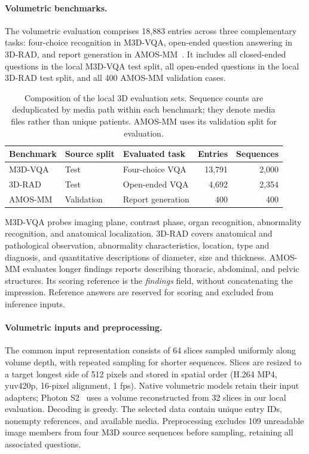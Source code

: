 \paragraph{Volumetric benchmarks.}
\label{app:datasets_3d}

The volumetric evaluation comprises 18,883 entries across three complementary tasks: four-choice recognition in M3D-VQA, open-ended question answering in 3D-RAD, and report generation in AMOS-MM~\citep{bai2024m3d,gai2025threedrad,ji2024amosmm}. It includes all closed-ended questions in the local M3D-VQA test split, all open-ended questions in the local 3D-RAD test split, and all 400 AMOS-MM validation cases.

\begin{table}[H]
\centering\small
\caption{Composition of the local 3D evaluation sets. Sequence counts are deduplicated by media path within each benchmark; they denote media files rather than unique patients. AMOS-MM uses its validation split for evaluation.}
\label{tab:datasets_3d}
\setlength{\tabcolsep}{4pt}
\renewcommand{\arraystretch}{1.10}
\begin{tabularx}{\linewidth}{@{}llYrr@{}}
\toprule
Benchmark & Source split & Evaluated task & Entries & Sequences\\
\midrule
M3D-VQA & Test & Four-choice VQA & 13,791 & 2,000\\
3D-RAD & Test & Open-ended VQA & 4,692 & 2,354\\
AMOS-MM & Validation & Report generation & 400 & 400\\
\bottomrule
\end{tabularx}
\end{table}

M3D-VQA probes imaging plane, contrast phase, organ recognition, abnormality recognition, and anatomical localization. 3D-RAD covers anatomical and pathological observation, abnormality characteristics, location, type and diagnosis, and quantitative descriptions of diameter, size and thickness. AMOS-MM evaluates longer findings reports describing thoracic, abdominal, and pelvic structures. Its scoring reference is the \emph{findings} field, without concatenating the impression. Reference answers are reserved for scoring and excluded from inference inputs.

\paragraph{Volumetric inputs and preprocessing.}
The common input representation consists of 64 slices sampled uniformly along volume depth, with repeated sampling for shorter sequences. Slices are resized to a target longest side of 512 pixels and stored in spatial order (H.264 MP4, yuv420p, 16-pixel alignment, 1 fps). Native volumetric models retain their input adapters; Photon S2~\citep{fang2026photon} uses a volume reconstructed from 32 slices in our local evaluation. Decoding is greedy. The selected data contain unique entry IDs, nonempty references, and available media. Preprocessing excludes 109 unreadable image members from four M3D source sequences before sampling, retaining all associated questions.

